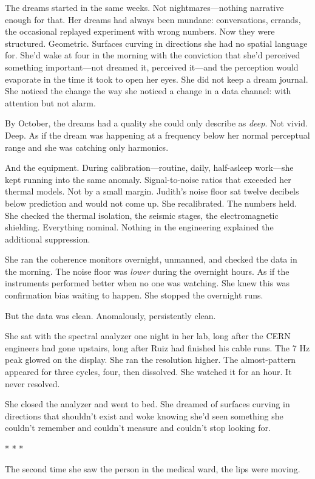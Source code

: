 \documentclass[12pt]{article}
\newcommand{\scenebreak}{\begin{center}* * *\end{center}}
\begin{document}
The dreams started in the same weeks. Not nightmares---nothing narrative enough for that. Her dreams had always been mundane: conversations, errands, the occasional replayed experiment with wrong numbers. Now they were structured. Geometric. Surfaces curving in directions she had no spatial language for. She'd wake at four in the morning with the conviction that she'd perceived something important---not dreamed it, perceived it---and the perception would evaporate in the time it took to open her eyes. She did not keep a dream journal. She noticed the change the way she noticed a change in a data channel: with attention but not alarm.

By October, the dreams had a quality she could only describe as \textit{deep}. Not vivid. Deep. As if the dream was happening at a frequency below her normal perceptual range and she was catching only harmonics.

And the equipment. During calibration---routine, daily, half-asleep work---she kept running into the same anomaly. Signal-to-noise ratios that exceeded her thermal models. Not by a small margin. Judith's noise floor sat twelve decibels below prediction and would not come up. She recalibrated. The numbers held. She checked the thermal isolation, the seismic stages, the electromagnetic shielding. Everything nominal. Nothing in the engineering explained the additional suppression.

She ran the coherence monitors overnight, unmanned, and checked the data in the morning. The noise floor was \textit{lower} during the overnight hours. As if the instruments performed better when no one was watching. She knew this was confirmation bias waiting to happen. She stopped the overnight runs.

But the data was clean. Anomalously, persistently clean.

She sat with the spectral analyzer one night in her lab, long after the CERN engineers had gone upstairs, long after Ruiz had finished his cable runs. The 7 Hz peak glowed on the display. She ran the resolution higher. The almost-pattern appeared for three cycles, four, then dissolved. She watched it for an hour. It never resolved.

She closed the analyzer and went to bed. She dreamed of surfaces curving in directions that shouldn't exist and woke knowing she'd seen something she couldn't remember and couldn't measure and couldn't stop looking for.

\scenebreak

The second time she saw the person in the medical ward, the lips were moving.
\end{document}
